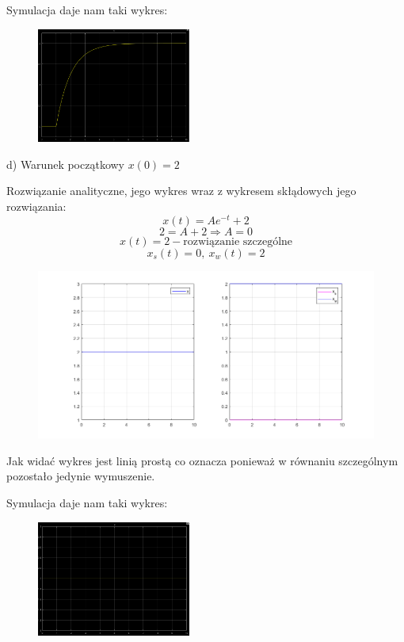 \documentclass{article}
\begin{document}
\newpage 

Symulacja daje nam taki wykres:\\
\begin{figure}[h!]
    \centering
    \includegraphics[width=0.45\textwidth]{./Screeny/x_0_sym.png}
    \label{fig:my_label}
\end{figure}

\begin{flushleft}
d) Warunek początkowy $x(0)=2$\\
\end{flushleft}
Rozwiązanie analityczne, jego wykres wraz z wykresem skłądowych jego rozwiązania:\\
$$
x(t)=Ae^{-t}+2
$$
$$
2=A+2 \Rightarrow A=0
$$
$$
x(t)=2-\text{rozwiązanie szczególne}
$$
$$
x_s(t)=0, \  x_w(t)=2
$$

\begin{figure}[h!]
    \centering
    \includegraphics[width=\textwidth]{./Screeny/x_2.png}
    \label{fig:my_label}
\end{figure}
Jak widać wykres jest linią prostą co oznacza ponieważ w równaniu szczególnym pozostało jedynie wymuszenie.

\newpage

Symulacja daje nam taki wykres:\\
\begin{figure}[h!]
    \centering
    \includegraphics[width=0.45\textwidth]{./Screeny/x_2_sym.png}
    \label{fig:my_label}
\end{figure}
\end{document}

